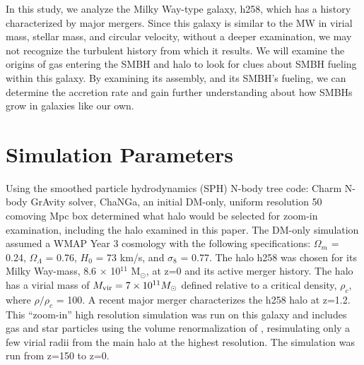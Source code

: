 \documentclass[manuscript]{aastex}
\begin{document}
In this study, we analyze the Milky Way-type galaxy, h258, which has a history characterized by major mergers. Since this galaxy is similar to the MW in virial mass, stellar mass, and circular velocity, without a deeper examination, we may not recognize the turbulent history from which it results. We will examine the origins of gas entering the SMBH and halo to look for clues about SMBH fueling within this galaxy. By examining its assembly, and its SMBH's fueling, we can determine the accretion rate and gain further understanding about how SMBHs grow in galaxies like our own.




\section{Simulation Parameters}\label{sec-model}

Using the smoothed particle hydrodynamics (SPH) N-body tree code: Charm N-body GrAvity solver, ChaNGa, an initial DM-only, uniform resolution 50 comoving Mpc box determined what halo would be selected for zoom-in examination, including the halo examined in this paper. The DM-only simulation assumed a WMAP Year 3 cosmology \citep{Spergel2007} with the following specifications: $\Omega _m$ = 0.24, $\Omega _{\Lambda}$ = 0.76, $H_0$ = 73 km/s, and $\sigma _8$ = 0.77. The halo h258 was chosen for its Milky Way-mass, 8.6 $\times$ 10$^{11}$  M$_{\odot}$, at z=0 and its active merger history. The halo has a virial mass of $M_{\rm vir} = 7 \times 10^{11} M_{\odot}$ defined relative to a critical density, $\rho _c$, where $\rho / \rho _c$ = 100. A recent major merger characterizes the h258 halo at z=1.2. This ``zoom-in'' high resolution simulation was run on this galaxy and includes gas and star particles using the volume renormalization of \cite{Katz1993}, resimulating only a few virial radii from the main halo at the highest resolution. The simulation was run from z=150 to z=0.  
\end{document}
